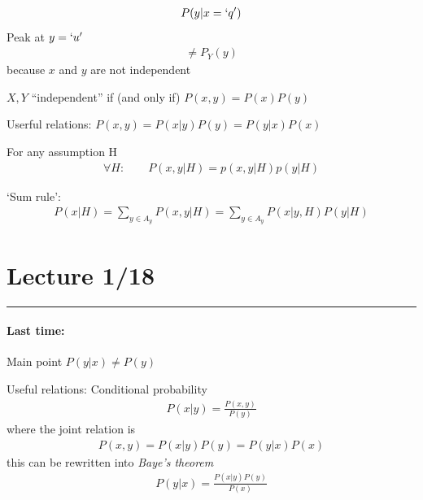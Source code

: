 \documentclass[../main.tex]{subfiles}
\begin{document}
\begin{align*}
    P(y | x = `q') 
\end{align*}
Peak at $y = `u'$
\begin{align*}
    \neq P_Y(y)
\end{align*}
because $x$ and $y$ are not independent

$X,Y$ ``independent'' if (and only if) $P(x,y) = P(x)P(y)$

Userful relations: $P(x, y) = P(x | y) P(y) = P(y | x) P(x)$

For any assumption H
\begin{align*}
    \forall H : \qquad P(x,y | H) = p(x, y | H) p(y | H)
\end{align*}

`Sum rule':
\begin{align*}
    P(x | H) = \sum_{y \in A_y} P(x,y | H) = \sum_{y \in A_y} P(x | y, H) P(y | H)
\end{align*}

\newpage
\section*{Lecture 1/18}
\hrule \vspace{10px}

\paragraph{Last time:} Main point $P(y|x) \neq P(y)$

Useful relations: Conditional probability
\begin{align*}
    P(x|y) = \frac{P(x,y)}{P(y)}
\end{align*}
where the joint relation is 
\begin{align*}
    P(x,y) = P(x|y) P(y) = P(y|x) P(x)
\end{align*}
this can be rewritten into \emph{Baye's theorem}
\begin{align*}
    P(y|x) = \frac{P(x|y) P(y)}{P(x)}
\end{align*}
\end{document}
